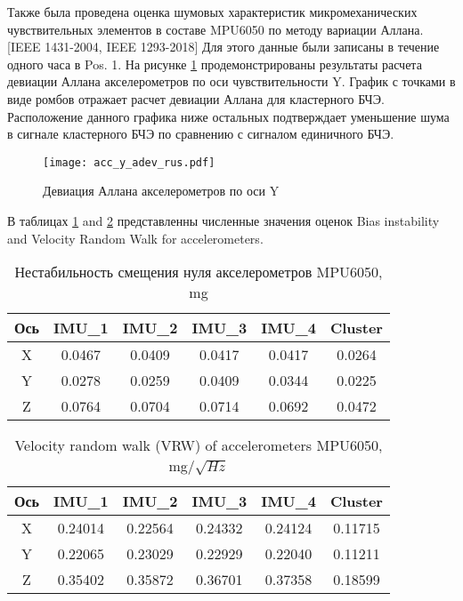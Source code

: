 Также была проведена оценка шумовых характеристик микромеханических чувствительных элементов в составе MPU6050 по методу вариации Аллана. [IEEE 1431-2004, IEEE 1293-2018]
Для этого данные были записаны в течение одного часа в Pos. 1. На рисунке \ref{fig:acc_y_allan} продемонстрированы результаты расчета девиации Аллана акселерометров по оси чувствительности Y.
График с точками в виде ромбов отражает расчет девиации Аллана для кластерного БЧЭ. Расположение данного графика ниже остальных подтверждает уменьшение шума в сигнале кластерного БЧЭ 
по сравнению с сигналом единичного БЧЭ.

\begin{figure}[h!]
	\centering
	\texttt{[image: acc\_y\_adev\_rus.pdf]}
	\caption{Девиация Аллана акселерометров по оси Y}
	\label{fig:acc_y_allan}
\end{figure}

\newpage

В таблицах \ref{table:acc_bias} and \ref{table:acc_vrw} представленны численные значения оценок Bias instability and Velocity Random Walk for accelerometers.

\begin{table}[h!]
	\centering
	\begin{tabular}{| c | c | c | c | c | c |}
	\hline
	Ось & IMU\_1 & IMU\_2 & IMU\_3 & IMU\_4 & Cluster \\ \hline
	X & 0.0467 & 0.0409 & 0.0417 & 0.0417 & 0.0264 \\ \hline
	Y & 0.0278 & 0.0259 & 0.0409 & 0.0344 & 0.0225 \\ \hline
	Z & 0.0764 & 0.0704 & 0.0714 & 0.0692 & 0.0472 \\
	\hline
	\end{tabular}
	\caption{Нестабильность смещения нуля акселерометров MPU6050, mg}
	\label{table:acc_bias}
\end{table}

\begin{table}[h!]
	\centering
	\begin{tabular}{| c | c | c | c | c | c |}
	\hline
	Ось & IMU\_1 & IMU\_2 & IMU\_3 & IMU\_4 & Cluster \\ \hline
	X & 0.24014 & 0.22564 & 0.24332 & 0.24124 & 0.11715 \\ \hline
	Y & 0.22065 & 0.23029 & 0.22929 & 0.22040 & 0.11211 \\ \hline
	Z & 0.35402 & 0.35872 & 0.36701 & 0.37358 & 0.18599 \\
	\hline
	\end{tabular}
	\caption{Velocity random walk (VRW) of accelerometers MPU6050, mg/$\sqrt{Hz}$}
	\label{table:acc_vrw}
\end{table}

